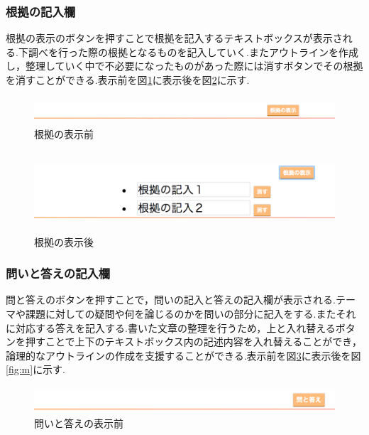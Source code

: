 \documentclass[a4j,12pt]{jarticle}
\begin{document}
\newpage
\subsubsection{根拠の記入欄}
根拠の表示のボタンを押すことで根拠を記入するテキストボックスが表示される.下調べを行った際の根拠となるものを記入していく.またアウトラインを作成し，整理していく中で不必要になったものがあった際には消すボタンでその根拠を消すことができる.表示前を図\ref{fig:j}に表示後を図\ref{fig:k}に示す.
\begin{figure}[h]
\begin{center}
 \includegraphics[clip,width=150mm,height=10mm]{figure/02konkyo.png}
\end{center}
 \caption{根拠の表示前}
 \label{fig:j}
\end{figure}

\begin{figure}[h]
\begin{center}
 \includegraphics[clip,width=150mm,height=30mm]{figure/03konkuo.png}
\end{center}
 \caption{根拠の表示後}
 \label{fig:k}
\end{figure}

\newpage
\subsubsection{問いと答えの記入欄}
問と答えのボタンを押すことで，問いの記入と答えの記入欄が表示される.テーマや課題に対しての疑問や何を論じるのかを問いの部分に記入をする.またそれに対応する答えを記入する.書いた文章の整理を行うため，上と入れ替えるボタンを押すことで上下のテキストボックス内の記述内容を入れ替えることができ，論理的なアウトラインの作成を支援することができる.表示前を図\ref{fig:l}に表示後を図\ref{fig:m}に示す.

\begin{figure}[h]
\begin{center}
 \includegraphics[clip,width=150mm,height=10mm]{figure/04qanda.png}
\end{center}
 \caption{問いと答えの表示前}
 \label{fig:l}
\end{figure}
\end{document}
